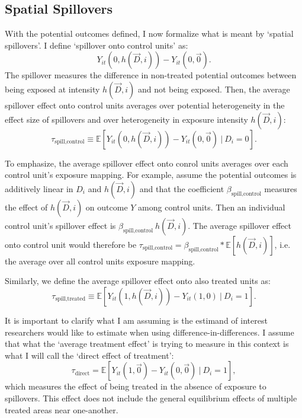 \documentclass[11pt]{article}
\begin{document}
\subsection{Spatial Spillovers}

With the potential outcomes defined, I now formalize what is meant by `spatial spillovers'. I define `spillover onto control units' as: \[
    Y_{it}(0, h(\vec{D}, i)) - Y_{it}(0, \vec{0}).
\] 
The spillover measures the difference in non-treated potential outcomes between being exposed at intensity $h(\vec{D}, i)$ and not being exposed. Then, the average spillover effect onto control units averages over potential heterogeneity in the effect size of spillovers and over heterogeneity in exposure intensity $h(\vec{D}, i)$: \[
    \tau_{\text{spill,control}} \equiv \mathbb{E} \left[ Y_{it}(0, h(\vec{D}, i)) - Y_{it}(0, \vec{0}) \ \vert \ D_i = 0 \right].
\]

To emphasize, the average spillover effect onto conrol units averages over each control unit's exposure mapping. For example, assume the potential outcomes is additively linear in $D_i$ and $h(\vec{D}, i)$ and that the coefficient $\beta_{\text{spill,control}}$ measures the effect of $h(\vec{D}, i)$ on outcome $Y$ among control units. Then an individual control unit's spillover effect is $\beta_{\text{spill,control}} \ h(\vec{D}, i)$. The average spillover effect onto control unit would therefore be $\tau_{\text{spill,control}} = \beta_{\text{spill,control}} * \mathbb{E} \left[ h(\vec{D}, i)\right]$, i.e. the average over all control units exposure mapping.

Similarly, we define the average spillover effect onto also treated units as: \[ 
    \tau_{\text{spill,treated}} \equiv \mathbb{E} \left[ Y_{it}(1, h(\vec{D}, i)) - Y_{it}(1, 0) \ \vert \ D_i = 1 \right].
\] 

It is important to clarify what I am assuming is the estimand of interest researchers would like to estimate when using difference-in-differences. I assume that what the `average treatment effect' is trying to measure in this context is what I will call the `direct effect of treatment': \[
    \tau_{\text{direct}} = \mathbb{E} \left[ Y_{it}(1, \vec{0}) - Y_{it}(0, \vec{0}) \ \vert \ D_i = 1 \right],
\] 
which measures the effect of being treated in the absence of exposure to spillovers. This effect does not include the general equilibrium effects of multiple treated areas near one-another.
\end{document}
